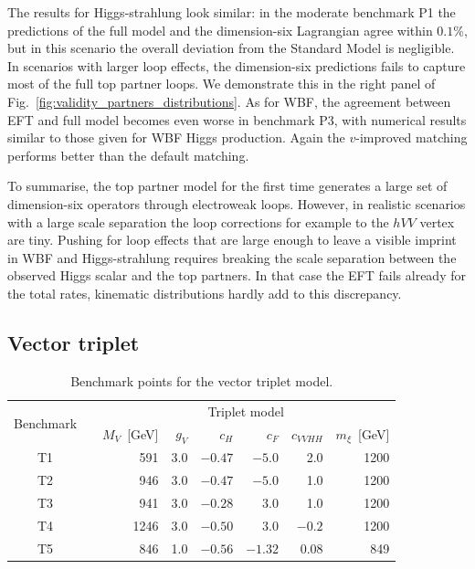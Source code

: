 The results for Higgs-strahlung look similar: in the moderate
benchmark P1 the predictions of the full model and the dimension-six
Lagrangian agree within $0.1 \%$, but in this scenario the overall
deviation from the Standard Model is negligible. In scenarios with
larger loop effects, the dimension-six predictions fails to capture most
of the full top partner loops.  We demonstrate this in the right panel
of Fig.~\ref{fig:validity_partners_distributions}.  As for WBF, the agreement
between EFT and full model becomes even worse in benchmark P3, with
numerical results similar to those given for WBF Higgs
production. Again the $v$-improved matching performs better than the
default matching.

To summarise, the top partner model for the first time generates a
large set of dimension-six operators through electroweak loops. However,
in realistic scenarios with a large scale separation the loop
corrections for example to the $hVV$ vertex are tiny.  Pushing for
loop effects that are large enough to leave a visible imprint in WBF
and Higgs-strahlung requires breaking the scale separation between the
observed Higgs scalar and the top partners. In that case the EFT fails
already for the total rates, kinematic distributions hardly add to
this discrepancy.



\subsection{Vector triplet}
\label{sec:validity_triplet}

\begin{table}[t] \renewcommand{\arraystretch}{1.2}
\setlength{\tabcolsep}{0.3em} \centering
    \begin{tabular}{c c rrrrrr} \toprule \multirow{2}{*}{Benchmark}
&\hspace*{1em}& \multicolumn{6}{c}{Triplet model} \\ \cmidrule{3-8} &&
$M_V$~[GeV] & $g_V$ & $c_H$ & ${c}_{F}$ & ${c}_{VVHH}$ & $m_\xi$~[GeV]
\\ \midrule T1 && 591 & 3.0 & $-0.47$ & $-5.0$ & 2.0 & 1200 \\ T2 &&
946 & 3.0 & $-0.47$ & $-5.0$ & 1.0 & 1200 \\ T3 && 941 & 3.0 & $-0.28$
& $3.0$ & 1.0 & 1200 \\ T4 && 1246 & 3.0 & $-0.50$ & $3.0$ & $-0.2$ &
1200 \\ T5 && 846 & 1.0 & $-0.56$ & $-1.32$ & $0.08$ & 849 \\
\bottomrule
    \end{tabular}
  \caption{Benchmark points for the vector triplet model.}
  \label{tab:triplet_benchmarks} \setlength{\tabcolsep}{0.5em}
\end{table}

